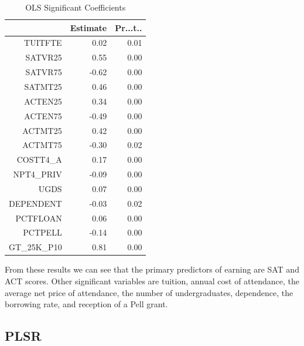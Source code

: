 \documentclass{article}
\begin{document}
\begin{table}[ht]
\centering
\begin{tabular}{rrr}
  \hline
 & Estimate & Pr...t.. \\ 
  \hline
TUITFTE & 0.02 & 0.01 \\ 
  SATVR25 & 0.55 & 0.00 \\ 
  SATVR75 & -0.62 & 0.00 \\ 
  SATMT25 & 0.46 & 0.00 \\ 
  ACTEN25 & 0.34 & 0.00 \\ 
  ACTEN75 & -0.49 & 0.00 \\ 
  ACTMT25 & 0.42 & 0.00 \\ 
  ACTMT75 & -0.30 & 0.02 \\ 
  COSTT4\_A & 0.17 & 0.00 \\ 
  NPT4\_PRIV & -0.09 & 0.00 \\ 
  UGDS & 0.07 & 0.00 \\ 
  DEPENDENT & -0.03 & 0.02 \\ 
  PCTFLOAN & 0.06 & 0.00 \\ 
  PCTPELL & -0.14 & 0.00 \\ 
  GT\_25K\_P10 & 0.81 & 0.00 \\ 
   \hline
\end{tabular}
\caption{OLS Significant Coefficients} 
\end{table}
From these results we can see that the primary predictors of earning are SAT and ACT scores. Other significant variables are tuition, annual cost of attendance, the average net price of attendance, the number of undergraduates, dependence, the borrowing rate, and reception of a Pell grant.

\subsection{PLSR}
\end{document}
